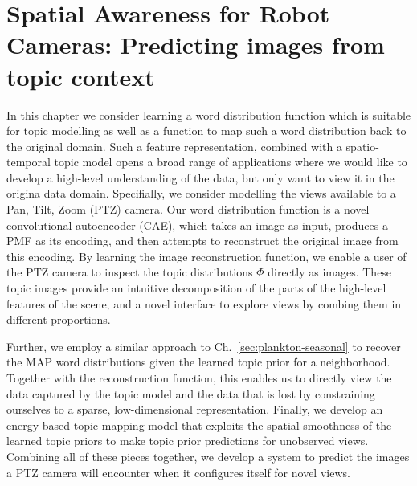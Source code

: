 
\chapter{Spatial Awareness for Robot Cameras: Predicting images from topic context} \label{ch:spatial-prediction}

In this chapter we consider learning a word distribution function which is suitable for topic modelling as well as a function to map such a word distribution back to the original domain. Such a feature representation, combined with a spatio-temporal topic model opens a broad range of applications where we would like to develop a high-level understanding of the data, but only want to view it in the origina data domain. Specifially, we consider modelling the views available to a Pan, Tilt, Zoom (PTZ) camera. Our word distribution function is a novel convolutional autoencoder (CAE), which takes an image as input, produces a PMF as its encoding, and then attempts to reconstruct the original image from this encoding. By learning the image reconstruction function, we enable a user of the PTZ camera to inspect the topic distributions $\Phi$ directly as images. These topic images provide an intuitive decomposition of the parts of the high-level features of the scene, and a novel interface to explore views by combing them in different proportions.

Further, we employ a similar approach to Ch.~\ref{sec:plankton-seasonal} to recover the MAP word distributions given the learned topic prior for a neighborhood. Together with the reconstruction function, this enables us to directly view the data captured by the topic model and the data that is lost by constraining ourselves to a sparse, low-dimensional representation. Finally, we develop an energy-based topic mapping model that exploits the spatial smoothness of the learned topic priors to make topic prior predictions for unobserved views. Combining all of these pieces together, we develop a system to predict the images a PTZ camera will encounter when it configures itself for novel views.


